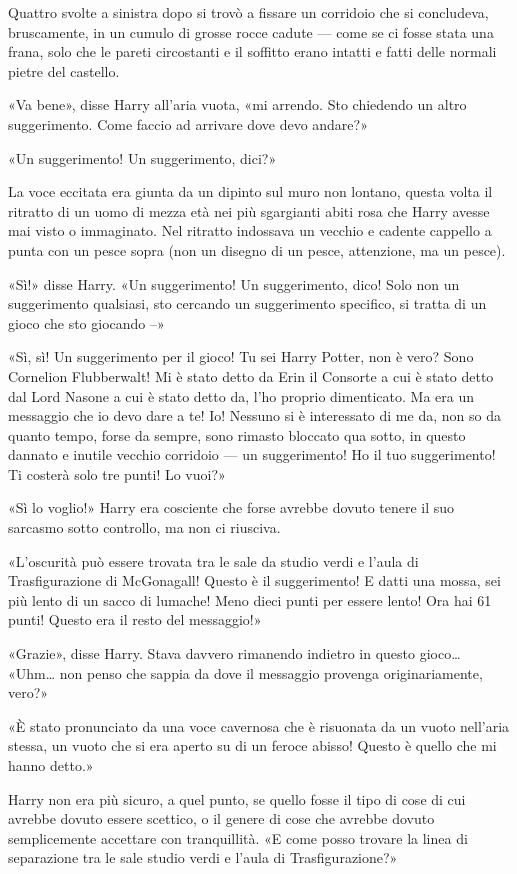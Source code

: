 Quattro svolte a sinistra dopo si trovò a fissare un corridoio che si concludeva, bruscamente, in un cumulo di grosse rocce cadute — come se ci fosse stata una frana, solo che le pareti circostanti e il soffitto erano intatti e fatti delle normali pietre del castello.

«Va bene», disse Harry all’aria vuota, «mi arrendo. Sto chiedendo un altro suggerimento. Come faccio ad arrivare dove devo andare?»

«Un suggerimento! Un suggerimento, dici?»

La voce eccitata era giunta da un dipinto sul muro non lontano, questa volta il ritratto di un uomo di mezza età nei più sgargianti abiti rosa che Harry avesse mai visto o immaginato. Nel ritratto indossava un vecchio e cadente cappello a punta con un pesce sopra (non un disegno di un pesce, attenzione, ma un pesce).

«Sì!» disse Harry. «Un suggerimento! Un suggerimento, dico! Solo non un suggerimento qualsiasi, sto cercando un suggerimento specifico, si tratta di un gioco che sto giocando –»

«Sì, sì! Un suggerimento per il gioco! Tu sei Harry Potter, non è vero? Sono Cornelion Flubberwalt! Mi è stato detto da Erin il Consorte a cui è stato detto dal Lord Nasone a cui è stato detto da, l’ho proprio dimenticato. Ma era un messaggio che io devo dare a te! Io! Nessuno si è interessato di me da, non so da quanto tempo, forse da sempre, sono rimasto bloccato qua sotto, in questo dannato e inutile vecchio corridoio — un suggerimento! Ho il tuo suggerimento! Ti costerà solo tre punti! Lo vuoi?»

«Sì lo voglio!» Harry era cosciente che forse avrebbe dovuto tenere il suo sarcasmo sotto controllo, ma non ci riusciva.

«L’oscurità può essere trovata tra le sale da studio verdi e l’aula di Trasfigurazione di McGonagall! Questo è il suggerimento! E datti una mossa, sei più lento di un sacco di lumache! Meno dieci punti per essere lento! Ora hai 61 punti! Questo era il resto del messaggio!»

«Grazie», disse Harry. Stava davvero rimanendo indietro in questo gioco… «Uhm… non penso che sappia da dove il messaggio provenga originariamente, vero?»

«È stato pronunciato da una voce cavernosa che è risuonata da un vuoto nell’aria stessa, un vuoto che si era aperto su di un feroce abisso! Questo è quello che mi hanno detto.»

Harry non era più sicuro, a quel punto, se quello fosse il tipo di cose di cui avrebbe dovuto essere scettico, o il genere di cose che avrebbe dovuto semplicemente accettare con tranquillità. «E come posso trovare la linea di separazione tra le sale studio verdi e l’aula di Trasfigurazione?»

